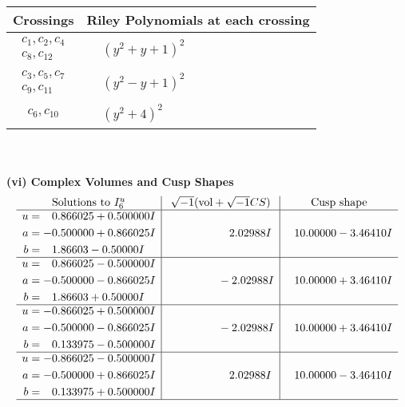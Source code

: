 \documentclass[1p]{elsarticle_modified}
\theoremstyle{definition}
\newcommand{\I}{\sqrt{-1}}
\begin{document}
\begin{tabular}{m{50pt}|m{274pt}}
Crossings & \hspace{64pt}Riley Polynomials at each crossing \\
\hline $$\begin{aligned}c_{1},c_{2},c_{4}\\c_{8},c_{12}\end{aligned}$$&$\begin{aligned}
&(y^2+y+1)^2
\end{aligned}$\\
\hline $$\begin{aligned}c_{3},c_{5},c_{7}\\c_{9},c_{11}\end{aligned}$$&$\begin{aligned}
&(y^2- y+1)^2
\end{aligned}$\\
\hline $$\begin{aligned}c_{6},c_{10}\end{aligned}$$&$\begin{aligned}
&(y^2+4)^2
\end{aligned}$\\
\hline
\end{tabular}\\~\\
\newpage\flushleft \textbf{(vi) Complex Volumes and Cusp Shapes}
$$\begin{array}{c|c|c}  
\text{Solutions to }I^u_{6}& \I (\text{vol} + \sqrt{-1}CS) & \text{Cusp shape}\\
 \hline 
\begin{aligned}
u &= \phantom{-}0.866025 + 0.500000 I \\
a &= -0.500000 + 0.866025 I \\
b &= \phantom{-}1.86603 - 0.50000 I\end{aligned}
 & \phantom{-0.000000 -}2.02988 I & \phantom{-}10.00000 - 3.46410 I \\ \hline\begin{aligned}
u &= \phantom{-}0.866025 - 0.500000 I \\
a &= -0.500000 - 0.866025 I \\
b &= \phantom{-}1.86603 + 0.50000 I\end{aligned}
 & \phantom{-0.000000 } -2.02988 I & \phantom{-}10.00000 + 3.46410 I \\ \hline\begin{aligned}
u &= -0.866025 + 0.500000 I \\
a &= -0.500000 - 0.866025 I \\
b &= \phantom{-}0.133975 - 0.500000 I\end{aligned}
 & \phantom{-0.000000 } -2.02988 I & \phantom{-}10.00000 + 3.46410 I \\ \hline\begin{aligned}
u &= -0.866025 - 0.500000 I \\
a &= -0.500000 + 0.866025 I \\
b &= \phantom{-}0.133975 + 0.500000 I\end{aligned}
 & \phantom{-0.000000 -}2.02988 I & \phantom{-}10.00000 - 3.46410 I\\
 \hline 
 \end{array}$$\newpage\newpage\renewcommand{\arraystretch}{1}
\end{document}

